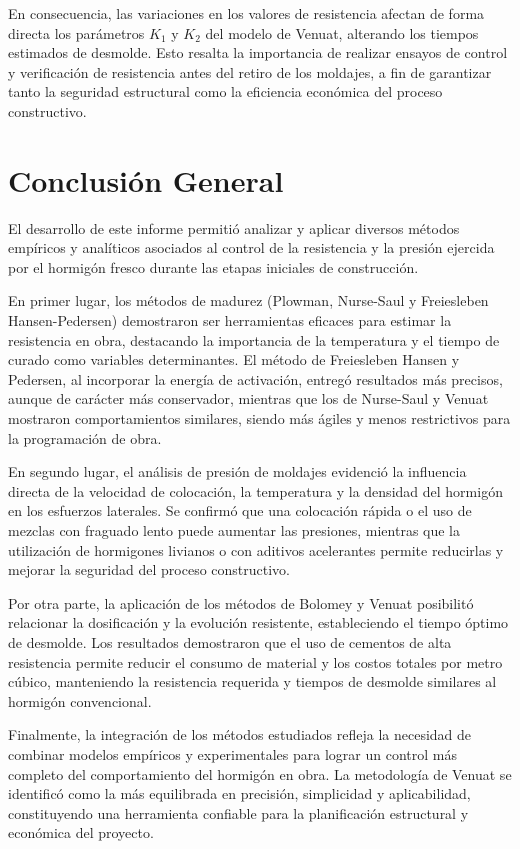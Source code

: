 En consecuencia, las variaciones en los valores de resistencia afectan de forma directa los parámetros $K_1$ y $K_2$ del modelo de Venuat, alterando los tiempos estimados de desmolde.  
Esto resalta la importancia de realizar ensayos de control y verificación de resistencia antes del retiro de los moldajes, a fin de garantizar tanto la seguridad estructural como la eficiencia económica del proceso constructivo.

\newpage
\section{Conclusión General}

El desarrollo de este informe permitió analizar y aplicar diversos métodos empíricos y analíticos asociados al control de la resistencia y la presión ejercida por el hormigón fresco durante las etapas iniciales de construcción.  

En primer lugar, los métodos de madurez (Plowman, Nurse-Saul y Freiesleben Hansen-Pedersen) demostraron ser herramientas eficaces para estimar la resistencia en obra, destacando la importancia de la temperatura y el tiempo de curado como variables determinantes. El método de Freiesleben Hansen y Pedersen, al incorporar la energía de activación, entregó resultados más precisos, aunque de carácter más conservador, mientras que los de Nurse-Saul y Venuat mostraron comportamientos similares, siendo más ágiles y menos restrictivos para la programación de obra.

En segundo lugar, el análisis de presión de moldajes evidenció la influencia directa de la velocidad de colocación, la temperatura y la densidad del hormigón en los esfuerzos laterales. Se confirmó que una colocación rápida o el uso de mezclas con fraguado lento puede aumentar las presiones, mientras que la utilización de hormigones livianos o con aditivos acelerantes permite reducirlas y mejorar la seguridad del proceso constructivo.

Por otra parte, la aplicación de los métodos de Bolomey y Venuat posibilitó relacionar la dosificación y la evolución resistente, estableciendo el tiempo óptimo de desmolde. Los resultados demostraron que el uso de cementos de alta resistencia permite reducir el consumo de material y los costos totales por metro cúbico, manteniendo la resistencia requerida y tiempos de desmolde similares al hormigón convencional.

Finalmente, la integración de los métodos estudiados refleja la necesidad de combinar modelos empíricos y experimentales para lograr un control más completo del comportamiento del hormigón en obra. La metodología de Venuat se identificó como la más equilibrada en precisión, simplicidad y aplicabilidad, constituyendo una herramienta confiable para la planificación estructural y económica del proyecto.
